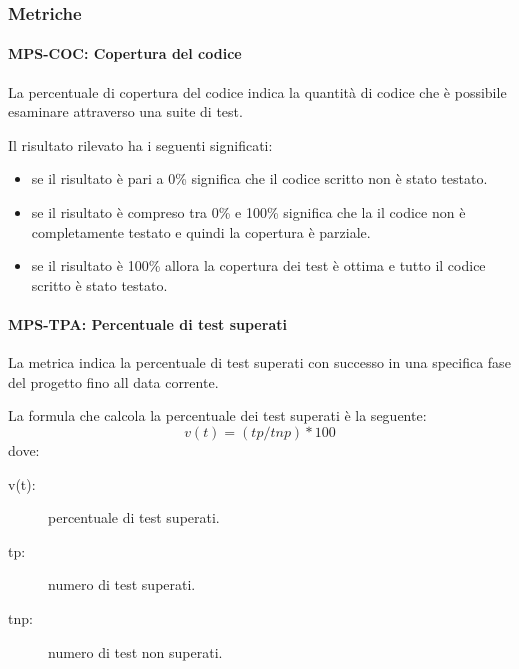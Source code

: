 \documentclass[../../norme-di-progetto.tex]{subfiles}
\begin{document}



\subsubsection{Metriche}%
\label{subs:verifica/metriche}

\paragraph{MPS-COC: Copertura del codice}%
\label{par:MPS-COC_copertura_codice}

La percentuale di copertura del codice indica la quantità di codice che è possibile esaminare attraverso una suite di test.

Il risultato rilevato ha i seguenti significati:
\begin{itemize}
  \item se il risultato è pari a 0\% significa che il codice scritto non è stato testato.
  \item se il risultato è compreso tra 0\% e 100\% significa che la il codice non è completamente testato e quindi la copertura è parziale.
  \item se il risultato è 100\% allora la copertura dei test è ottima e tutto il codice scritto è stato testato.
\end{itemize}



\paragraph{MPS-TPA: Percentuale di test superati}%
\label{par:MPS-TPA_test_passati}

La metrica indica la percentuale di test superati con successo in una specifica fase del progetto fino all data corrente.

La formula che calcola la percentuale dei test superati è la seguente:
\[
 v(t) = (tp / tnp) * 100
\]
dove:
\begin{description}
 \item[v(t):] percentuale di test superati. %
 \item[tp:] numero di test superati.
 \item[tnp:] numero di test non superati.

\end{description}
\end{document}
